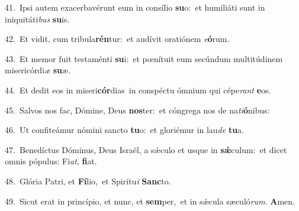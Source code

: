 {\numbfont\textcolor{\numbcolor}{41.}}~Ipsi autem exacerbavérunt eum in consílio \textbf{su}\-o:~\star et humiliáti sunt in iniquitáti\textit{bus} \textbf{su}\-is.\par
{\numbfont\textcolor{\numbcolor}{42.}}~Et vidit, cum tribula\-\textbf{rén}\-tur:~\star et audívit oratiónem \textit{e}\-\textbf{ó}rum.\par
{\numbfont\textcolor{\numbcolor}{43.}}~Et memor fuit testaménti \textbf{su}\-i:~\star et pœnítuit eum secúndum multitúdinem misericórdi\textit{æ} \textbf{su}\-æ.\par
{\numbfont\textcolor{\numbcolor}{44.}}~Et dedit eos in miseri\-\textbf{cór}\-dias~\star in conspéctu ómnium qui cépe\textit{rant} \textbf{e}\-os.\par
{\numbfont\textcolor{\numbcolor}{45.}}~Salvos nos fac, Dómine, Deus \textbf{nos}\-ter:~\star et cóngrega nos de na\-\textit{ti}\-\textbf{ó}nibus:\par
{\numbfont\textcolor{\numbcolor}{46.}}~Ut confiteámur nómini sancto \textbf{tu}\-o:~\star et gloriémur in lau\textit{de} \textbf{tu}\-a.\par
{\numbfont\textcolor{\numbcolor}{47.}}~Benedíctus Dóminus, Deus Israël, a sǽculo et usque in \textbf{sǽ}\-culum:~\star et dicet omnis pópulus: Fi\-\textit{at}\-, \textbf{fi}\-at.\par
{\numbfont\textcolor{\numbcolor}{48.}}~Glória Patri, et \textbf{Fí}\-lio,~\star et Spirítu\textit{i} \textbf{Sanc}\-to.\par
{\numbfont\textcolor{\numbcolor}{49.}}~Sicut erat in princípio, et nunc, et \textbf{sem}\-per,~\star et in sǽcula sæculó\-\textit{rum}\-. \textbf{A}\-men.\par
